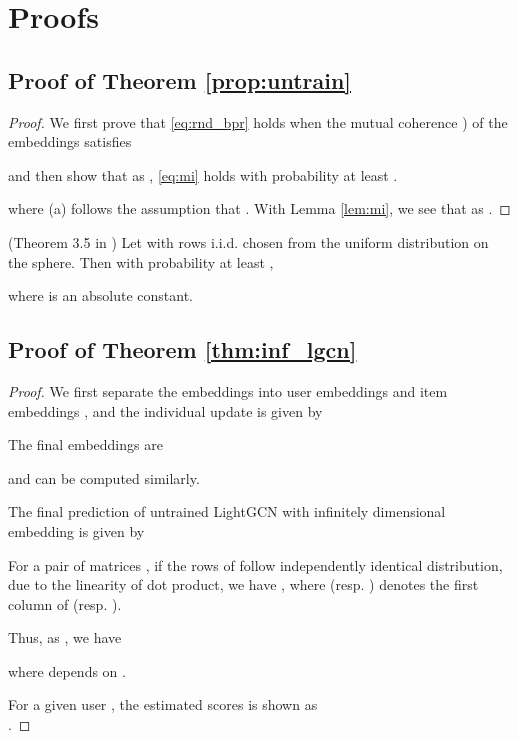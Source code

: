\documentclass[sigconf]{acmart}
\begin{document}
\section{Proofs}

\subsection{Proof of Theorem \ref{prop:untrain}}
\begin{proof}
We first prove that \eqref{eq:rnd_bpr} holds when the mutual coherence \cite{donoho2003optimally}) of the embeddings satisfies

and then show that as , \eqref{eq:mi} holds with probability at least .

where (a) follows the assumption that . With Lemma \ref{lem:mi}, we see that  as .
\end{proof}

\begin{lemma} \label{lem:mi} (Theorem 3.5 in \cite{Wright-Ma-2021})
    Let  with rows i.i.d. chosen from the uniform distribution on the sphere. Then with probability at least ,
    
    where  is an absolute constant.
\end{lemma}

\subsection{Proof of Theorem \ref{thm:inf_lgcn}}
\begin{proof}
We first separate the embeddings  into user embeddings  and item embeddings , and the individual update is given by


The final embeddings are 

and  can be computed similarly.

The final prediction of untrained LightGCN with infinitely dimensional embedding is given by




For a pair of matrices , if the rows of  follow independently identical distribution, due to the linearity of dot product, we have , where  (resp. ) denotes the first column of  (resp. ).

Thus, as , we have 

where  depends on .

For a given user , the estimated scores is shown as \\ .

\end{proof}
\end{document}
